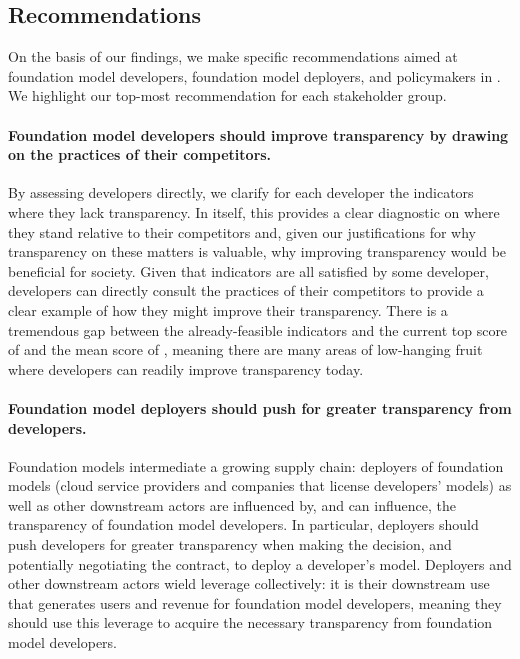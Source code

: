 \hypertarget{recommendations}{\subsection{Recommendations}}
\label{sec:recommendations}

On the basis of our findings, we make specific recommendations aimed at foundation model developers, foundation model deployers, and policymakers in . 
We highlight our top-most recommendation for each stakeholder group.

\paragraph{Foundation model developers should improve transparency by drawing on the practices of their competitors.}
By assessing developers directly, we clarify for each developer the indicators where they lack transparency.
In itself, this provides a clear diagnostic on where they stand relative to their competitors and, given our justifications for why transparency on these matters is valuable, why improving transparency would be beneficial for society.
Given that \numfeasible indicators are all satisfied by some developer, developers can directly consult the practices of their competitors to provide a clear example of how they might improve their transparency.
There is a tremendous gap between the \numfeasible already-feasible indicators and the current top score of \maxscore and the mean score of \meanscore, meaning there are many areas of low-hanging fruit where developers can readily improve transparency today. 

\paragraph{Foundation model deployers should push for greater transparency from developers.}
Foundation models intermediate a growing supply chain: deployers of foundation models (\eg cloud service providers and companies that license developers' models) as well as other downstream actors are influenced by, and can influence, the transparency of foundation model developers.
In particular, deployers should push developers for greater transparency when making the decision, and potentially negotiating the contract, to deploy a developer's model.
Deployers and other downstream actors wield leverage collectively: it is their downstream use that generates users and revenue for foundation model developers, meaning they should use this leverage to acquire the necessary transparency from foundation model developers.

